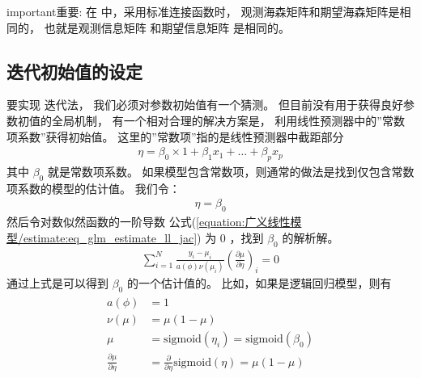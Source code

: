 \documentclass[letterpaper,10pt,english]{sphinxmanual}
\begin{document}
\begin{sphinxadmonition}{important}{重要:}
在  中，采用标准连接函数时，
观测海森矩阵和期望海森矩阵是相同的，
也就是观测信息矩阵  和期望信息矩阵  是相同的。
\end{sphinxadmonition}


\subsection{迭代初始值的设定}
\label{\detokenize{_u5e7f_u4e49_u7ebf_u6027_u6a21_u578b/estimate:id9}}
要实现  迭代法，
我们必须对参数初始值有一个猜测。
但目前没有用于获得良好参数初值的全局机制，
有一个相对合理的解决方案是，
利用线性预测器中的”常数项系数”获得初始值。
这里的”常数项”指的是线性预测器中截距部分
\begin{equation}\label{equation:广义线性模型/estimate:广义线性模型/estimate:30}
\begin{split}\eta = \beta_0 \times 1 + \beta_1 x_1 +\dots + \beta_px_p\end{split}
\end{equation}
其中 \(\beta_0\) 就是常数项系数。
如果模型包含常数项，则通常的做法是找到仅包含常数项系数的模型的估计值。
我们令：
\begin{equation}\label{equation:广义线性模型/estimate:广义线性模型/estimate:31}
\begin{split}\eta = \beta_0\end{split}
\end{equation}
然后令对数似然函数的一阶导数 公式(\ref{equation:广义线性模型/estimate:eq_glm_estimate_ll_jac}) 为
\(0\) ，找到 \(\beta_0\)
的解析解。
\begin{equation}\label{equation:广义线性模型/estimate:eq_34_37}
\begin{split}\sum_{i=1}^N \frac{y_i-\mu_i}{a(\phi) \nu(\mu_i) } \left ( \frac{\partial \mu}{\partial \eta} \right )_i
=0\end{split}
\end{equation}
通过上式是可以得到 \(\beta_0\) 的一个估计值的。
比如，如果是逻辑回归模型，则有
\begin{align}\label{equation:广义线性模型/estimate:广义线性模型/estimate:32}\!\begin{aligned}
a(\phi) &= 1\\
\nu(\mu) &= \mu(1-\mu)\\
\mu &= \text{sigmoid}(\eta_i) = \text{sigmoid}(\beta_0)\\
\frac{\partial \mu}{\partial \eta} &= \frac{\partial }{\partial \eta} \text{sigmoid} (\eta) = \mu(1-\mu)\\
\end{aligned}\end{align}
\end{document}
